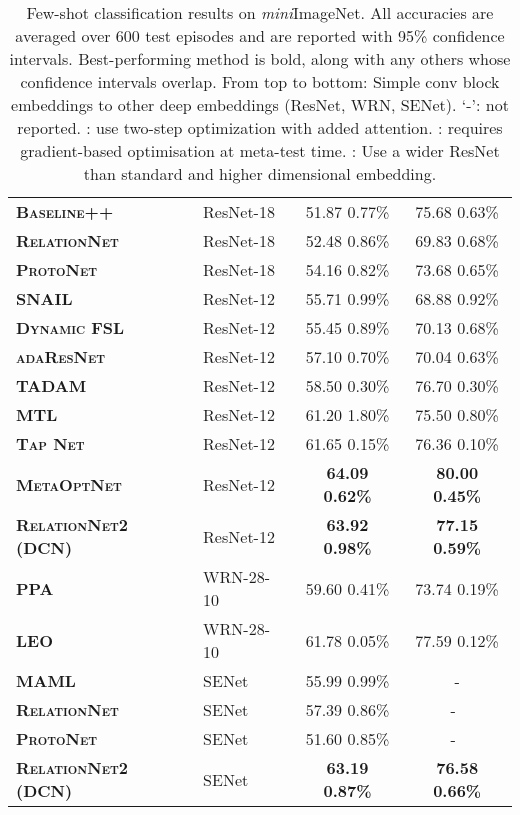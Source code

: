 \documentclass[conference]{IEEEtran}
\def\modelnameshort{DCN}
\def\miniIN{\textit{mini}ImageNet}
\newcommand{\cut}[1]{}
\begin{document}
\begin{table}[t]
\begin{tabular}{@{} llcc @{}}
\midrule
\textbf{\textsc{Baseline++}} \cite{chen2019closerfewshot} & ResNet-18 &  51.87  0.77\% & 75.68  0.63\% \\ 
\textbf{\textsc{RelationNet}} \cite{chen2019closerfewshot} & ResNet-18 &  52.48  0.86\% & 69.83  0.68\% \\
\textbf{\textsc{ProtoNet}} \cite{chen2019closerfewshot} & ResNet-18 &  54.16  0.82\% & 73.68  0.65\% \\ 
\textbf{\textsc{SNAIL}} \cite{santoro2017simple} & ResNet-12 &55.71  0.99\% & 68.88  0.92\% \\ 
\textbf{\textsc{Dynamic FSL}} \cite{gidaris2018dynamic} & ResNet-12& 55.45  0.89\% & 70.13  0.68\% \\ 
\textbf{\textsc{adaResNet}} \cite{munkhdalai2018rapid} & ResNet-12 & 57.10  0.70\% & 70.04  0.63\% \\
\textbf{\textsc{TADAM}} \cite{oreshkin2018tadam} & ResNet-12 & 58.50  0.30\% & {76.70  0.30\%} \\
\textbf{\textsc{MTL}} \cite{sun2019meta} & ResNet-12 & 61.20  1.80\% & 75.50  0.80\% \\
\textbf{\textsc{Tap Net}} \cite{yoon2019tapnet} & ResNet-12 & 61.65  0.15\% & 76.36  0.10\% \\
\textbf{\textsc{MetaOptNet}} \cite{lee2019meta} & ResNet-12 & \textbf{64.09  0.62\%} & \textbf{80.00  0.45\%} \\ 
\textbf{\textsc{RelationNet2 (\modelnameshort{})}} & ResNet-12 & \textbf{63.92  0.98\%} & \textbf{77.15  0.59\%} \\ 
\midrule

\textbf{\textsc{PPA}} \cite{qiao2017few} & WRN-28-10 & 59.60  0.41\% & 73.74  0.19\% \\ 
\textbf{\textsc{LEO}} \cite{rusu2019leo} & WRN-28-10 & 61.78  0.05\% & 77.59  0.12\% \\ 

\midrule
\textbf{\textsc{MAML}} & SENet & 55.99  0.99\%  & -\\
\textbf{\textsc{RelationNet}} & SENet & 57.39  0.86\% & -\ \\ 
\textbf{\textsc{ProtoNet}} & SENet & 51.60  0.85\% & -\ \\
\textbf{\textsc{RelationNet2 (\modelnameshort{})}} &SENet & \textbf{63.19  0.87\%} & \textbf{76.58  0.66\%} \\ 

\bottomrule
\end{tabular}
\caption{\small \small
Few-shot classification results on \miniIN{}. All accuracies are averaged over 600 test episodes and are reported with 95\% confidence intervals. Best-performing method is bold, along with any others whose confidence intervals overlap. From top to bottom: Simple conv block embeddings to other deep embeddings (ResNet, WRN, SENet). `-': not reported. : use two-step optimization with added attention. \cut{: Trained with union of train and validation classes.} : requires gradient-based optimisation at meta-test time. : Use a wider ResNet than standard and higher dimensional embedding. 
}
\label{tab:mini}
\end{table}
\end{document}

